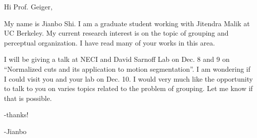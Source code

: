 Hi Prof. Geiger,

	My name is Jianbo Shi.  I am a graduate student working
with Jitendra Malik at UC Berkeley.    My current research interest is
on the topic of grouping and perceptual organization.  I have read
many of your works in this area.

	I will be giving a talk at NECI and David Sarnoff Lab on Dec. 8
and 9 on ``Normalized cuts and its application to motion segmentation''.
I am wondering if I could visit you and your lab on Dec. 10.  I would
very much like the opportunity to talk to you on varies topics related
to the problem of grouping.  Let me know if that is possible.

	-thanks!

			-Jianbo
